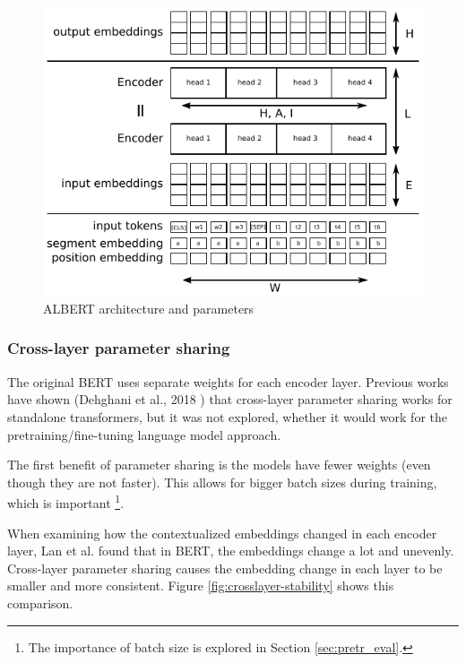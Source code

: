 \documentclass[
  printed, %
  color,   %
  table,   %
  oneside, %
  lof,     %
  lot,     %
]{fithesis3}
\begin{document}
\begin{figure}[hbt]
  \begin{center}
    \includegraphics[width=0.9\linewidth]{img/albert.pdf}
  \end{center}
  \vspace{-0.5cm}
  \caption{ALBERT architecture and parameters}
  \label{fig:albert}
\end{figure}

\subsubsection{Cross-layer parameter sharing}
The original BERT uses separate weights for each encoder layer. Previous works have shown (Dehghani et al., 2018 \parencite{uni-trans}) that cross-layer parameter sharing works for standalone transformers, but it was not explored, whether it would work for the pretraining/fine-tuning language model approach. 

The first benefit of parameter sharing is the models have fewer weights (even though they are not faster). This allows for bigger batch sizes during training, which is important \footnote{The importance of batch size is explored in Section \ref{sec:pretr_eval}.}.

When examining how the contextualized embeddings changed in each encoder layer, Lan et al. found that in BERT, the embeddings change a lot and unevenly. Cross-layer parameter sharing causes the embedding change in each layer to be smaller and more consistent. Figure \ref{fig:crosslayer-stability} shows this comparison.  
\end{document}
